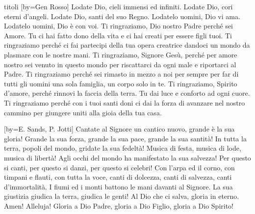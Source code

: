 \begin{songs}{titoli}
[by={Gen Rosso}]
\beginchorus
Lodate Dio, cieli immensi ed infiniti.
Lodate Dio, cori eterni d'angeli.
Lodate Dio, santi del suo Regno.
Lodatelo uomini, Dio vi ama.
Lodatelo uomini, Dio è con voi.
\endchorus
\beginverse
Ti ringraziamo, Dio nostro Padre
perché sei Amore. Tu ci hai fatto dono della vita
e ci hai creati per essere figli tuoi.
Ti ringraziamo perché ci fai partecipi
della tua opera creatrice
dandoci un mondo da plasmare
con le nostre mani.
\endverse
\beginverse
Ti ringraziamo, Signore Gesù,
perché per amore nostro sei venuto in questo mondo
per riscattarci da ogni male e riportarci al Padre.
Ti ringraziamo perché sei rimasto
in mezzo a noi per sempre
per far di tutti gli uomini una sola famiglia,
un corpo solo in te.
\endverse
\beginverse
Ti ringraziamo, Spirito d'amore,
perché rinnovi la faccia della terra.
Tu dai luce e conforto ad ogni cuore.
Ti ringraziamo perché con i tuoi santi doni
ci dai la forza di avanzare nel nostro cammino
per giungere uniti alla gioia della tua casa.
\endverse
\endsong

[by={E. Sands, P. Jotti}]
\beginverse
Cantate al Signore un cantico nuovo, grande è la sua gloria!
Grande la sua forza, grande la sua pace, grande la sua santità!
\endverse
\beginchorus
In tutta la terra, popoli del mondo, gridate la sua fedeltà!
Musica di festa, musica di lode, musica di libertà!
\endchorus
\beginverse
Agli occhi del mondo ha manifestato la sua salvezza!
Per questo si canti, per questo si danzi, per questo si celebri!
\endverse
\beginverse
Con l'arpa ed il corno, con timpani e flauti, con tutta la voce,
canti di dolcezza, canti di salvezza, canti d'immortalità.
\endverse
\beginverse
I fiumi ed i monti battono le mani davanti al Signore.
La sua giustizia giudica la terra, giudica le genti!
\endverse
\beginverse
Al Dio che ci salva, gloria in eterno. Amen! Alleluja!
Gloria a Dio Padre, gloria a Dio Figlio, gloria a Dio Spirito!
\endverse
\endsong


\end{songs}
